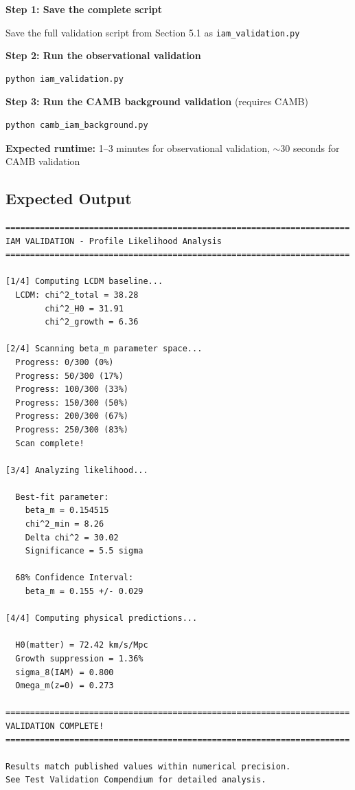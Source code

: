 \documentclass[11pt]{article}
\begin{document}
\textbf{Step 1: Save the complete script}

Save the full validation script from Section 5.1 as \texttt{iam\_validation.py}

\textbf{Step 2: Run the observational validation}
\begin{lstlisting}[language=bash]
python iam_validation.py
\end{lstlisting}

\textbf{Step 3: Run the CAMB background validation} (requires CAMB)
\begin{lstlisting}[language=bash]
python camb_iam_background.py
\end{lstlisting}

\textbf{Expected runtime:} 1--3 minutes for observational validation, $\sim$30 seconds for CAMB validation

\subsection{Expected Output}

\begin{lstlisting}
======================================================================
IAM VALIDATION - Profile Likelihood Analysis
======================================================================

[1/4] Computing LCDM baseline...
  LCDM: chi^2_total = 38.28
        chi^2_H0 = 31.91
        chi^2_growth = 6.36

[2/4] Scanning beta_m parameter space...
  Progress: 0/300 (0%)
  Progress: 50/300 (17%)
  Progress: 100/300 (33%)
  Progress: 150/300 (50%)
  Progress: 200/300 (67%)
  Progress: 250/300 (83%)
  Scan complete!

[3/4] Analyzing likelihood...

  Best-fit parameter:
    beta_m = 0.154515
    chi^2_min = 8.26
    Delta chi^2 = 30.02
    Significance = 5.5 sigma

  68% Confidence Interval:
    beta_m = 0.155 +/- 0.029

[4/4] Computing physical predictions...

  H0(matter) = 72.42 km/s/Mpc
  Growth suppression = 1.36%
  sigma_8(IAM) = 0.800
  Omega_m(z=0) = 0.273

======================================================================
VALIDATION COMPLETE!
======================================================================

Results match published values within numerical precision.
See Test Validation Compendium for detailed analysis.
\end{lstlisting}
\end{document}
